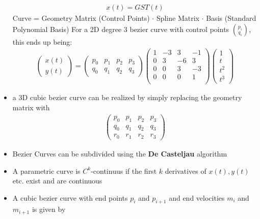 \documentclass{scrartcl}
\begin{document}
\begin{itemize}
    \begin{align*}
        x(t) = GST(t)
    \end{align*}
    Curve = Geometry Matrix (Control Points) $\cdot$ Spline Matrix $\cdot$ Basis (Standard Polynomial Basis)
    For a 2D degree 3 bezier curve with control points $\binom{p_i}{q_i}$, this ends up being:
    \begin{align*}
        \begin{pmatrix}
            x(t) \\ y(t)
        \end{pmatrix}
        =
        \begin{pmatrix}
            p_0 & p_1 & p_2 & p_3 \\ q_0 & q_1 & q_2 & q_3
        \end{pmatrix}
        \begin{pmatrix}
            1 & -3 & 3 & -1\\
            0 & 3 & -6 & 3\\
            0 & 0 & 3 & -3\\
            0 & 0 & 0 & 1\\
        \end{pmatrix}
        \begin{pmatrix}
            1 \\ t \\ t^2 \\ t^3
        \end{pmatrix}
    \end{align*}
    \item a 3D cubic bezier curve can be realized by simply replacing the geometry matrix with
    \begin{align*}
        \begin{pmatrix}
            p_0 & p_1 & p_2 & p_3 \\ q_0 & q_1 & q_2 & q_3\\ r_0 & r_1 & r_2 & r_3
        \end{pmatrix}   
    \end{align*}
    \item Bezier Curves can be subdivided using the \textbf{De Casteljau} algorithm
    \item A parametric curve is $C^k$-continuus if the first $k$ derivatives of $x(t), y(t)$ etc. exist and are continuous
    \item A cubic bezier curve with end points $p_i$ and $p_{i+1}$ and end velocities $m_i$ and $m_{i+1}$ is given by
    \begin{align*}

\end{align*}
\end{itemize}
\end{document}

